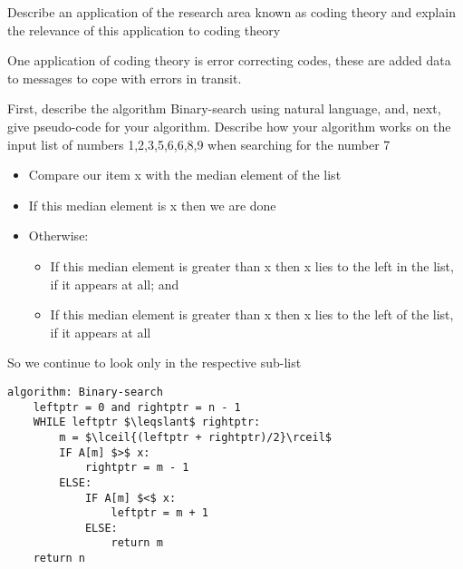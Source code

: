 \documentclass[addpoints]{exam}
\begin{document}
\begin{questions}
\newpage
\question[4]Describe an application of the research area known as coding theory and explain the relevance of this application to coding theory
\begin{solution}[2in]
	One application of coding theory is error correcting codes, these are added data to messages to cope with errors in transit.
\end{solution}


\question[10]First, describe the algorithm Binary-search using natural language, and, next, give pseudo-code for your algorithm. Describe how your algorithm works on the input list of numbers 1,2,3,5,6,6,8,9 when searching for the number 7
\begin{solution}[2in]
	\begin{itemize}
		\item Compare our item x with the median element of the list
		\item If this median element is x then we are done
		\item Otherwise:
		\begin{itemize}
			\item If this median element is greater than x then x lies to the left in the list, if it appears at all; and
			\item If this median element is greater than x then x lies to the left of the list, if it appears at all
		\end{itemize}
	\end{itemize}
So we continue to look only in the respective sub-list
\begin{lstlisting}[tabsize=4,mathescape]
algorithm: Binary-search
	leftptr = 0 and rightptr = n - 1
	WHILE leftptr $\leqslant$ rightptr:
		m = $\lceil{(leftptr + rightptr)/2}\rceil$
		IF A[m] $>$ x:
			rightptr = m - 1
		ELSE:
			IF A[m] $<$ x:
				leftptr = m + 1
			ELSE:
				return m
	return n
\end{lstlisting}
\end{solution}


\end{questions}
\end{document}
